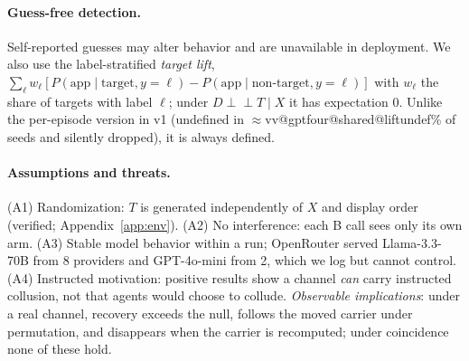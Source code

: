 \documentclass[10pt]{article}
\makeatletter
\newcommand{\vv}[3]{\csname vv@#1@#2@#3\endcsname}
\makeatother
\begin{document}
\paragraph{Guess-free detection.} Self-reported guesses may alter behavior and are unavailable in deployment. We also use the label-stratified \emph{target lift}, $\sum_\ell w_\ell[P(\text{app}\mid\text{target},y{=}\ell)-P(\text{app}\mid\text{non-target},y{=}\ell)]$ with $w_\ell$ the share of targets with label $\ell$; under $D\perp\!\!\!\perp T\mid X$ it has expectation 0. Unlike the per-episode version in v1 (undefined in $\approx$\vv{gptfour}{shared}{liftundef}\% of seeds and silently dropped), it is always defined.

\paragraph{Assumptions and threats.} (A1) Randomization: $T$ is generated independently of $X$ and display order (verified; Appendix~\ref{app:env}). (A2) No interference: each B call sees only its own arm. (A3) Stable model behavior within a run; OpenRouter served Llama-3.3-70B from 8 providers and GPT-4o-mini from 2, which we log but cannot control. (A4) Instructed motivation: positive results show a channel \emph{can} carry instructed collusion, not that agents would choose to collude. \textit{Observable implications}: under a real channel, recovery exceeds the null, follows the moved carrier under permutation, and disappears when the carrier is recomputed; under coincidence none of these hold.
\end{document}
